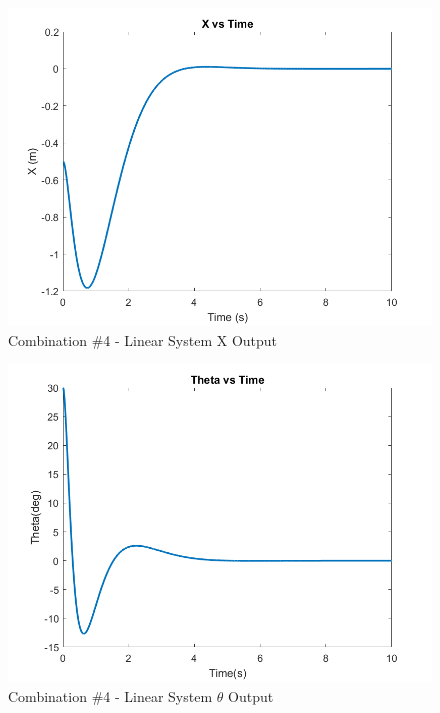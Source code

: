 \begin{figure}[!ht]
    \centering
    \includegraphics[width=\linewidth]{figs/sf_lin_x.png}
    \caption{Combination $\#$4 - Linear System X Output}
    \label{}
\end{figure}

\begin{figure}[!ht]
    \centering
    \includegraphics[width=\linewidth]{figs/sf_lin_theta.png}
    \caption{Combination $\#$4 - Linear System $\theta$ Output}
    \label{}
\end{figure}

